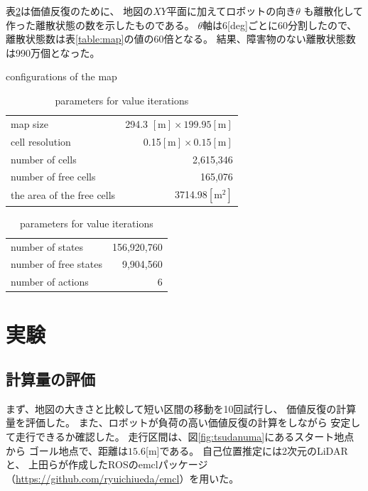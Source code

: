 \documentclass{jarticle}
\begin{document}
表\ref{table:cells}は価値反復のために、
地図の$XY$平面に加えてロボットの向き$\theta$
も離散化して作った離散状態の数を示したものである。
$\theta$軸は6[deg]ごとに60分割したので、
離散状態数は表\ref{table:map}の値の60倍となる。
結果、障害物のない離散状態数は990万個となった。

\begin{table}[bth]
  \caption{conﬁgurations of the map}
	\label{table:map}
  \centering
	\begin{small}
  \begin{tabular}{l|r}
    \hline
    map size & 294.3 $\mathrm{[m]}\times 199.95\mathrm{[m]}$\\
    cell resolution &  0.15$\mathrm{[m]}\times 0.15\mathrm{[m]}$ \\
		number of cells & 2,615,346\\
    number of free cells & 165,076\\
		the area of the free cells & 3714.98$\mathrm{[m^2]}$\\
    \hline
  \end{tabular}
	\end{small}
	\caption{parameters for value iterations}
	\label{table:cells}
  \centering
	\begin{small}
  \begin{tabular}{l|r}
    \hline
    number of states & 156,920,760\\
    number of free states &  9,904,560\\
		number of actions & 6\\
    \hline
  \end{tabular}
	\end{small}
\end{table}

\section{実験}%

\subsection{計算量の評価}

まず、地図の大きさと比較して短い区間の移動を10回試行し、
価値反復の計算量を評価した。
また、ロボットが負荷の高い価値反復の計算をしながら
安定して走行できるか確認した。
走行区間は、図\ref{fig:tsudanuma}にあるスタート地点から
ゴール地点で、距離は$15.6$[m]である。
自己位置推定には2次元のLiDARと、
上田らが作成したROSのemclパッケージ
（\url{https://github.com/ryuichiueda/emcl}）を用いた。
\end{document}
